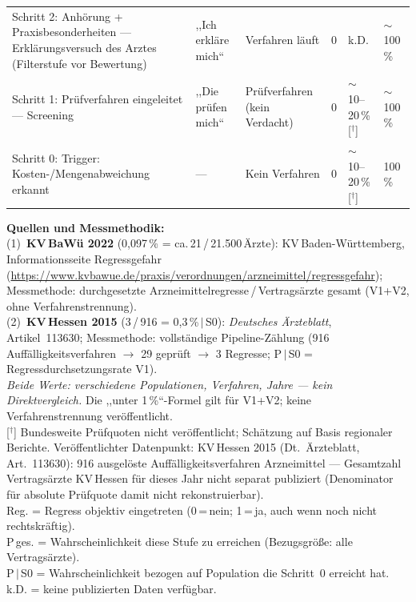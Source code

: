 \documentclass{umbruch-position}
\begin{document}
{\begin{tabularx}{\textwidth}{p{3.5cm} p{2.4cm} p{2.3cm} p{0.6cm} p{1.7cm} p{1.9cm}}
\addlinespace
\rowcolor{umbruch-teal!10} Schritt 2: Anhörung + Praxis\-besonder\-heiten --- Erklärungs\-versuch des Arztes (Filterstufe vor Bewertung) & ,,Ich erkläre mich`` & Verfahren läuft & 0 & k.D. & $\sim$100\,\% \\
\addlinespace
\rowcolor{umbruch-teal!10} Schritt 1: Prüf\-verfahren ein\-geleitet --- Screening & ,,Die prüfen mich`` & Prüf\-verfahren (kein Verdacht) & 0 & $\sim$10--20\,\% [$^\dagger$] & $\sim$100\,\% \\
\addlinespace
\rowcolor{umbruch-teal!10} Schritt 0: Trigger: Kosten-/Mengen\-abweichung erkannt & --- & Kein Verfahren & 0 & $\sim$10--20\,\% [$^\dagger$] & 100\,\% \\
\bottomrule
\end{tabularx}

\smallskip
\noindent[*] \textbf{Quellen und Messmethodik:}\\
(1)~\textbf{KV\,BaWü 2022} (0,097\,\% = ca.\,21\,/\,21.500\,Ärzte): KV\,Baden-Württemberg, Informationsseite Regressgefahr (\url{https://www.kvbawue.de/praxis/verordnungen/arzneimittel/regressgefahr}); Messmethode: durchgesetzte Arzneimittelregresse\,/\,Vertragsärzte gesamt (V1+V2, ohne Verfahrenstrennung).\\
(2)~\textbf{KV\,Hessen 2015} (3\,/\,916 = 0,3\,\%\,$|$\,S0): \textit{Deutsches Ärzteblatt}, Artikel~113630; Messmethode: vollständige Pipeline-Zählung (916 Auffälligkeitsverfahren $\to$ 29 geprüft $\to$ 3 Regresse; P\,$|$\,S0 = Regressdurchsetzungsrate V1).\\
\textit{Beide Werte: verschiedene Populationen, Verfahren, Jahre --- kein Direktvergleich.} Die ,,unter 1\,\%``-Formel gilt für V1+V2; keine Verfahrenstrennung veröffentlicht.\\
{[$^\dagger$] Bundesweite Prüfquoten nicht veröffentlicht; Schätzung auf Basis regionaler Berichte. Veröffentlichter Datenpunkt: KV\,Hessen 2015 (Dt.~Ärzteblatt, Art.~113630): 916 ausgelöste Auffälligkeitsverfahren Arzneimittel --- Gesamtzahl Vertragsärzte KV\,Hessen für dieses Jahr nicht separat publiziert (Denominator für absolute Prüfquote damit nicht rekonstruierbar).}\\
Reg. = Regress objektiv eingetreten (0\,=\,nein; 1\,=\,ja, auch wenn noch nicht rechts\-kräftig).\\
P\,ges. = Wahrscheinlichkeit diese Stufe zu erreichen (Bezugsgröße: alle Vertragsärzte).\\
P\,$|$\,S0 = Wahrscheinlichkeit bezogen auf Population die Schritt~0 erreicht hat. \quad
k.D. = keine publizierten Daten verfügbar.
}
\end{document}
